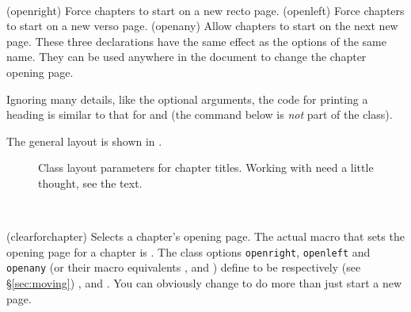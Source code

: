 \begin{syntax}
\cmd{\openright} \cmd{\openleft} \cmd{\openany} \\
\end{syntax}
\glossary(openright)%
  {}%
  {Force chapters to start on a new recto page.}
\glossary(openleft)%
  {}%
  {Force chapters to start on a new verso page.}
\glossary(openany)%
  {}%
  {Allow chapters to start on the next new page.}
These three declarations have the same effect as the options of the same name.
They can be used anywhere in the document to change the chapter opening page.

Ignoring many details, like the optional arguments, the code for
printing a \cmd{\chapter} heading is similar to that for \cmd{\book}
and \cmd{\part} (the  command below is \emph{not}
part of the class).
\begin{lcode}
\newcommand{\chapterhead}[1]{ %
  \clearforchapter        %
  \thispagestyle{chapter} %
  \insertchapterspace     %
  \chapterheadstart       %
  \printchaptername\chapternamenum\printchapternum
  \afterchapternum        %
  \printchaptertitle{#1}  %
  \afterchaptertitle}     %
\end{lcode}
The general layout is shown in .

\begin{figure}
\centering
\chapterdiagram
\caption{Class layout parameters for chapter titles. Working with
   need a little thought, see the text.}
\label{lay:chap}
\end{figure}

\begin{syntax}
\cmd{\clearforchapter} \\
\end{syntax}
\glossary(clearforchapter)%
  {}%
  {Selects a chapter's opening page.}
The actual macro that sets the opening page for a chapter is
\cmd{\clearforchapter}. The class options \texttt{openright},
\texttt{openleft} and \texttt{openany} (or their macro equivalents
\cmd{\openright}, \cmd{\openleft} and
\cmd{\openany}) define \cmd{\clearforchapter} to be respectively
(see \S\ref{sec:moving})
\cmd{\cleartorecto}, \cmd{\cleartoverso} and \cmd{\clearpage}. You can
obviously change \cmd{\clearforchapter} to do more than just start a
new page.

